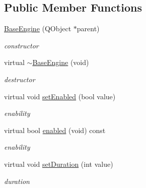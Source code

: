 \subsection*{Public Member Functions}
\begin{DoxyCompactItemize}
\item 
\mbox{\label{class_base_engine_aa43140b09db50e1703a45807414cd296}} 
\hyperlink{class_base_engine_aa43140b09db50e1703a45807414cd296}{Base\+Engine} (Q\+Object $\ast$parent)
\begin{DoxyCompactList}\small\item\em constructor \end{DoxyCompactList}\item 
\mbox{\label{class_base_engine_ac40de67b451e56a698f17f52fa11f54f}} 
virtual \hyperlink{class_base_engine_ac40de67b451e56a698f17f52fa11f54f}{$\sim$\+Base\+Engine} (void)
\begin{DoxyCompactList}\small\item\em destructor \end{DoxyCompactList}\item 
\mbox{\label{class_base_engine_a2b0291a8929bd1184696bd11bb5fbe13}} 
virtual void \hyperlink{class_base_engine_a2b0291a8929bd1184696bd11bb5fbe13}{set\+Enabled} (bool value)
\begin{DoxyCompactList}\small\item\em enability \end{DoxyCompactList}\item 
\mbox{\label{class_base_engine_a5efdb171ab0faa9de68c8e6cce6526c4}} 
virtual bool \hyperlink{class_base_engine_a5efdb171ab0faa9de68c8e6cce6526c4}{enabled} (void) const
\begin{DoxyCompactList}\small\item\em enability \end{DoxyCompactList}\item 
\mbox{\label{class_base_engine_a0fab5e112a326425a7701f10ee224dea}} 
virtual void \hyperlink{class_base_engine_a0fab5e112a326425a7701f10ee224dea}{set\+Duration} (int value)
\begin{DoxyCompactList}\small\item\em duration \end{DoxyCompactList}\item 

\end{DoxyCompactItemize}

